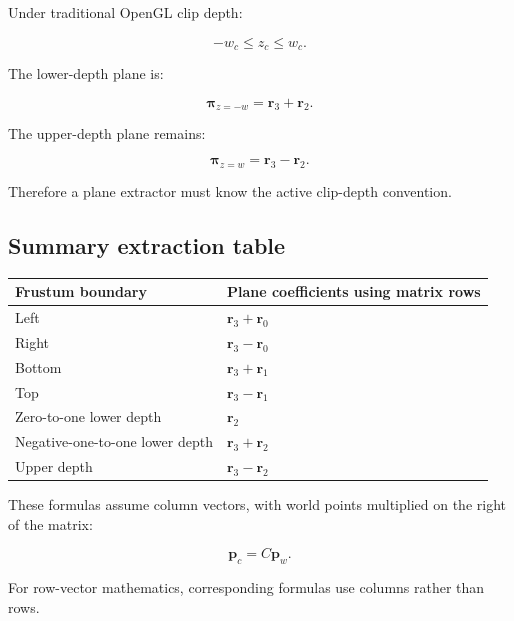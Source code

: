 Under traditional OpenGL clip depth:

\[
 -w_c\le z_c\le w_c.
\]

The lower-depth plane is:

\[
 \boxed{ \boldsymbol\pi_{z=-w}=\mathbf r_3+\mathbf r_2 }.
\]

The upper-depth plane remains:

\[
 \boxed{ \boldsymbol\pi_{z=w}=\mathbf r_3-\mathbf r_2 }.
\]

Therefore a plane extractor must know the active clip-depth convention.

\subsection{Summary extraction table}\label{02-foundations-ii-ch034-summary-extraction-table}

{\def\LTcaptype{none} %
\begin{longtable}[]{@{}
  >{\raggedright\arraybackslash}p{}
  >{\raggedright\arraybackslash}p{}@{}}
\toprule\noalign{}
\begin{minipage}[b]{\linewidth}\raggedright
Frustum boundary
\end{minipage} & \begin{minipage}[b]{\linewidth}\raggedright
Plane coefficients using matrix rows
\end{minipage} \\
\midrule\noalign{}
\endhead
\bottomrule\noalign{}
\endlastfoot
Left & \(\mathbf r_3+\mathbf r_0\) \\
Right & \(\mathbf r_3-\mathbf r_0\) \\
Bottom & \(\mathbf r_3+\mathbf r_1\) \\
Top & \(\mathbf r_3-\mathbf r_1\) \\
Zero-to-one lower depth & \(\mathbf r_2\) \\
Negative-one-to-one lower depth & \(\mathbf r_3+\mathbf r_2\) \\
Upper depth & \(\mathbf r_3-\mathbf r_2\) \\
\end{longtable}
}

These formulas assume column vectors, with world points multiplied on the right of the matrix:

\[
 \mathbf p_c=C\mathbf p_w.
\]

For row-vector mathematics, corresponding formulas use columns rather than rows.


